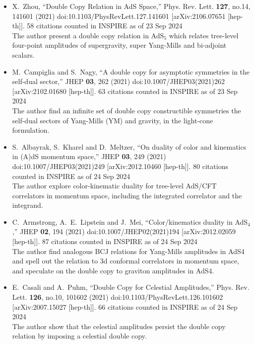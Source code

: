 \documentclass[a4paper,12pt]{article}
\begin{document}
\begin{itemize}
    \item %
    X.~Zhou,
    ``Double Copy Relation in AdS Space,''
    Phys. Rev. Lett. \textbf{127}, no.14, 141601 (2021)
    doi:10.1103/PhysRevLett.127.141601
    [arXiv:2106.07651 [hep-th]].
    58 citations counted in INSPIRE as of 23 Sep 2024\\
    The author present a double copy relation in Ad$\mathrm{S}_5$ which relates tree-level four-point amplitudes of supergravity, super Yang-Mills and bi-adjoint scalars.
    \item %
    M.~Campiglia and S.~Nagy,
    ``A double copy for asymptotic symmetries in the self-dual sector,''
    JHEP \textbf{03}, 262 (2021)
    doi:10.1007/JHEP03(2021)262
    [arXiv:2102.01680 [hep-th]].
    63 citations counted in INSPIRE as of 23 Sep 2024\\
    The author find an infinite set of double copy constructible symmetries the self-dual sectors
    of Yang-Mills (YM) and gravity, in the light-cone formulation.
    \item %
    S.~Albayrak, S.~Kharel and D.~Meltzer,
    ``On duality of color and kinematics in (A)dS momentum space,''
    JHEP \textbf{03}, 249 (2021)
    doi:10.1007/JHEP03(2021)249
    [arXiv:2012.10460 [hep-th]].
    80 citations counted in INSPIRE as of 24 Sep 2024\\
    The author explore color-kinematic duality for tree-level AdS/CFT correlators in momentum space, including the integrated correlator and the integrand.
    \item %
    C.~Armstrong, A.~E.~Lipstein and J.~Mei,
    ``Color/kinematics duality in AdS$_{4}$,''
    JHEP \textbf{02}, 194 (2021)
    doi:10.1007/JHEP02(2021)194
    [arXiv:2012.02059 [hep-th]].
    87 citations counted in INSPIRE as of 24 Sep 2024\\
    The author find analogous BCJ relations for Yang-Mills amplitudes in AdS4 and spell out the relation to 3d
    conformal correlators in momentum space, and speculate on the double copy to graviton
    amplitudes in AdS4.
    \item %
    E.~Casali and A.~Puhm,
    ``Double Copy for Celestial Amplitudes,''
    Phys. Rev. Lett. \textbf{126}, no.10, 101602 (2021)
    doi:10.1103/PhysRevLett.126.101602
    [arXiv:2007.15027 [hep-th]].
    66 citations counted in INSPIRE as of 24 Sep 2024\\
    The author show that the celestial amplitudes persist the double copy relation by imposing a celestial double copy.
\end{itemize}
\end{document}
